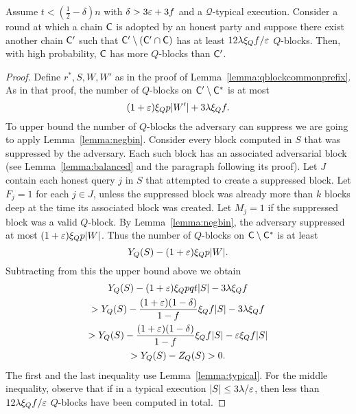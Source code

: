 \begin{lemma}\label{lemma:qblockcommonprefix12}
	Assume $t<(\frac12-\delta)n$ with $\delta>3\varepsilon+3f$ and a $\mathcal{Q}$-typical
	execution.
	Consider a round at which a chain $\mathsf{C}$ is adopted by an honest party and
	suppose there exist another chain $\mathsf{C}'$ such that
	$\mathsf{C}'\setminus(\mathsf{C}'\cap\mathsf{C})$ has at least $12\lambda\xi_Qf/\varepsilon$ $Q$-blocks.
	Then, with high probability, $\mathsf{C}$ has more $Q$-blocks than $\mathsf{C}'$.
\end{lemma}
\begin{proof}
	Define $r^*,S,W,W'$ as in the proof of
	Lemma~\ref{lemma:qblockcommonprefix}. As in that proof,
	the number of $Q$-blocks on $\mathsf{C}'\setminus\mathsf{C}^*$ is
	at most
	\[
		(1+\varepsilon)\xi_Qp|W'|+3\lambda\xi_Qf
	.\]
	To upper bound the number of $Q$-blocks the adversary can suppress we
	are going to apply Lemma~\ref{lemma:negbin}.
	Consider every block computed in $S$ that was suppressed by the
	adversary. Each such block has an associated adversarial block (see
	Lemma~\ref{lemma:balanced} and the paragraph following its proof).
	Let $J$ contain each honest query $j$ in $S$ that attempted to create
	a suppressed block.
	Let $F_j=1$ for each $j\in J$, unless the suppressed block was already
	more than $k$ blocks deep at the time its associated block was
	created.
	Let $M_j=1$ if the suppressed block was a valid $Q$-block.
	By Lemma~\ref{lemma:negbin}, the adversary suppressed at most
	$(1+\varepsilon)\xi_Qp|W|$. Thus
	the number of $Q$-blocks on $\mathsf{C}\setminus\mathsf{C}^*$ is at least
	\[
		Y_Q(S)-(1+\varepsilon)\xi_Qp|W|
	.\]
	Subtracting from this the upper bound above we obtain
	\begin{multline*}
		Y_Q(S)-(1+\varepsilon)\xi_Qpqt|S|-3\lambda\xi_Qf\\
		>Y_Q(S)-\frac{(1+\varepsilon)(1-\delta)}{1-f}\xi_Qf|S|-3\lambda\xi_Qf\\
		>Y_Q(S)-\frac{(1+\varepsilon)(1-\delta)}{1-f}\xi_Qf|S|-\varepsilon\xi_Qf|S|\\
		>Y_Q(S)-Z_Q(S)>0
	.\end{multline*}
	The first and the last inequality use Lemma~\ref{lemma:typical}. For
	the middle inequality, observe that if in a typical execution
	$|S|\leq3\lambda/\varepsilon$, then less than $12\lambda\xi_Qf/\varepsilon$ $Q$-blocks
	have been computed in total.
\end{proof}

